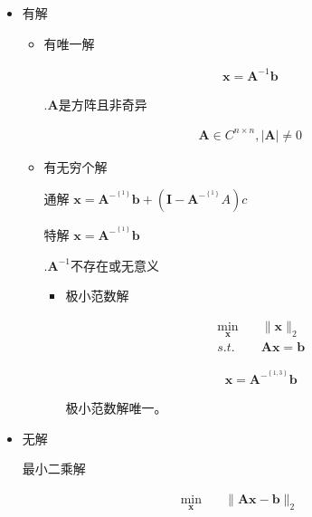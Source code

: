 \documentclass{article}
\begin{document}
\begin{enumerate}
\begin{enumerate}
\begin{enumerate}
\begin{itemize}
\begin{itemize}
								\begin{itemize}
								\item 有解\par
									\begin{itemize}
									\item 有唯一解\par
										\begin{align*}\boldsymbol x = \boldsymbol A^{-1} \boldsymbol b\end{align*}

										.$\boldsymbol A$是方阵且非奇异\par
										\begin{align*}\boldsymbol A \in C^{n\times n}, |\boldsymbol A| \neq  0\end{align*}

									\item 有无穷个解\par
										通解 $\boldsymbol x = \boldsymbol A^{-^{\left\{1\right\}}} \boldsymbol b + \left(\boldsymbol I - \boldsymbol A^{-^{\left\{1\right\}}} A\right) c$\par
										特解 $\boldsymbol x = \boldsymbol A^{-^{\left\{1\right\}}} \boldsymbol b$\par
										.$\boldsymbol A^{-1}$不存在或无意义\par
										\begin{itemize}
										\item 极小范数解\par
											\begin{align*}
\min_{\boldsymbol x} \quad& \| \boldsymbol x\| _2\\
s.t. \quad& \boldsymbol A \boldsymbol x = \boldsymbol b
\end{align*}

											\begin{align*}\boldsymbol x = \boldsymbol A^{-^{\left\{1,3\right\}}} \boldsymbol b\end{align*}

											极小范数解唯一。\par
										\end{itemize}
									\end{itemize}
								\item 无解\par
									最小二乘解\par
										\begin{align*}\min_{\boldsymbol x} \quad& \| \boldsymbol A \boldsymbol x - \boldsymbol b\| _2\end{align*}


\end{itemize}
\end{itemize}
\end{itemize}
\end{enumerate}
\end{enumerate}
\end{enumerate}
\end{document}
